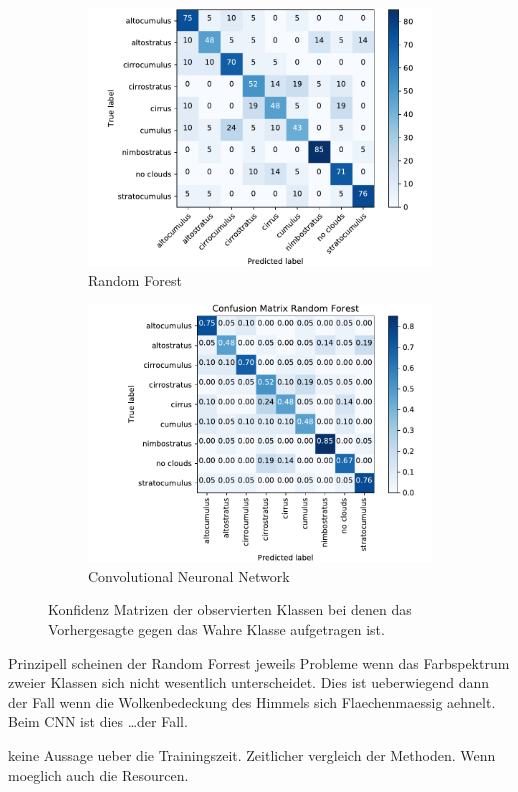 \begin{figure}[h]
		\centering
		\begin{subfigure}[b]{0.49\textwidth}
				\begin{center}
						\includegraphics[width=\textwidth]{./pictures/conf_rf.pdf}
				\end{center}
				\caption{Random Forest}
				\label{fig:conf_rf}
		\end{subfigure}
		\begin{subfigure}[b]{0.49\textwidth}
				\begin{center}
						\includegraphics[width=\textwidth]{./pictures/conf_cnn.pdf}
				\end{center}
				\caption{Convolutional Neuronal Network}
				\label{fig:conf_cnn}
		\end{subfigure}
		\caption{Konfidenz Matrizen der observierten Klassen bei denen das
		Vorhergesagte gegen das Wahre Klasse aufgetragen ist.}
		\label{fig:conf}
\end{figure}
Prinzipell scheinen der Random Forrest jeweils Probleme wenn das Farbspektrum
zweier Klassen sich nicht wesentlich unterscheidet.
Dies ist ueberwiegend dann der Fall wenn die Wolkenbedeckung des Himmels sich
Flaechenmaessig aehnelt. 
Beim CNN ist dies \ldots der Fall.

keine Aussage ueber die Trainingszeit.
Zeitlicher vergleich der Methoden.
Wenn moeglich auch die Resourcen.

